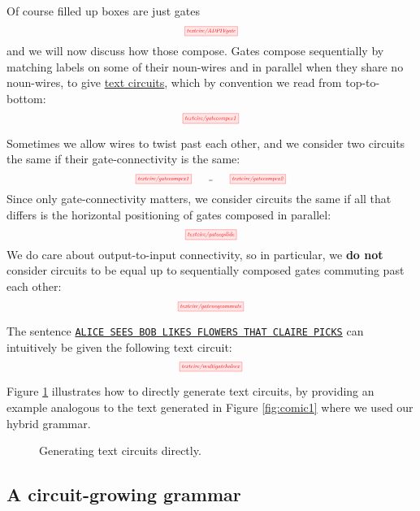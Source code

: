 Of course filled up boxes are just gates
\[
\scalebox{0.5}{\tikzfig{textcirc/ADPIVgate}}
\]
and we will now discuss how those compose. Gates compose sequentially by matching labels on some of their noun-wires and in parallel when they share no noun-wires,  to give \underline{text circuits}, which by convention we read from top-to-bottom:  
\[
\scalebox{0.5}{\tikzfig{textcirc/gatecompex1}}  
\]

\begin{convention}\label{conv:sliding}
Sometimes we allow wires to twist past each other, and we consider two circuits the same if their gate-connectivity is the same:
\[
\scalebox{0.5}{\tikzfig{textcirc/gatecompex1} \quad\quad = \quad\quad \tikzfig{textcirc/gatecompex2}}
\]
Since only gate-connectivity matters, we consider circuits the same if all that differs is the horizontal positioning of gates composed in parallel:
\[
\scalebox{0.5}{\tikzfig{textcirc/gateeqslide}} 
\]
We do care about output-to-input connectivity, so in particular, we {\bR\bf do not\e}
consider circuits to be equal up to sequentially composed gates commuting past each other:  
\[
\scalebox{0.5}{\tikzfig{textcirc/gateneqcommute}}  
\]
\end{convention}

\begin{example}  
The sentence \texttt{\underline{ALICE SEES BOB LIKES FLOWERS THAT CLAIRE PICKS}} can intuitively be given the following text circuit:
\[
\scalebox{0.5}{\tikzfig{textcirc/multigateholeex}}
\]
\end{example}

\begin{example}
Figure \ref{fig:circuitgen} illustrates how to directly generate text circuits, by providing an example analogous to the text generated in Figure \ref{fig:comic1} where we used our hybrid grammar.
\begin{figure}[h!]
    \centering
    \caption{Generating text circuits directly.}
    \label{fig:circuitgen}
\end{figure}
\end{example}

\subsection{A circuit-growing grammar}


